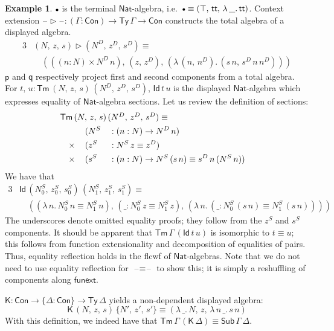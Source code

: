 \documentclass[12pt,a4paper,twoside,openany]{book}
\theoremstyle{remark}
\theoremstyle{definition}
\newtheorem{myexample}{Example}
\theoremstyle{theorem}
\newcommand{\ms}[1]{\mathsf{#1}}
\newcommand{\funext}{\ms{funext}}
\newcommand{\Con}{\mathsf{Con}}
\newcommand{\Sub}{\mathsf{Sub}}
\newcommand{\Tm}{\mathsf{Tm}}
\newcommand{\Ty}{\mathsf{Ty}}
\newcommand{\Id}{\mathsf{Id}}
\renewcommand{\tt}{\mathsf{tt}}
\newcommand{\blank}{\mathord{\hspace{1pt}\text{--}\hspace{1pt}}}
\newcommand{\ext}{\triangleright}
\newcommand{\emptycon}{\scaleobj{.75}\bullet}
\newcommand{\p}{\mathsf{p}}
\newcommand{\q}{\mathsf{q}}
\newcommand{\K}{\mathsf{K}}
\newcommand{\Nat}{\ms{Nat}}
\begin{document}
\begin{myexample}
$\emptycon$ is the terminal $\Nat$-algebra, i.e.\ $\emptycon \equiv
(\top,\,\tt,\,\lambda\,\_.\,\tt)$. Context extension $\blank\ext\blank : (\Gamma
: \Con) \to \Ty\,\Gamma \to \Con$ constructs the total algebra of a displayed
algebra.
\begin{alignat*}{3}
&(N,\,z,\,s) \ext (N^D,\,z^D,\,s^D) \equiv\\
&\hspace{1em}(((n : N) \times N^D\,n),\,(z,\,z^D),\,(\lambda\,(n,\,n^D).\,(s\,n,\,s^D\,n\,n^D)))
\end{alignat*}
$\p$ and $\q$ respectively project first and second components from a total
algebra. For $t,\,u : \Tm\,(N,\,z,\,s)\,(N^D,\,z^D,\,s^D)$, $\Id\,t\,u$ is the
displayed $\Nat$-algebra which expresses equality of $\Nat$-algebra sections.
Let us review the definition of sections:
\begin{alignat*}{3}
&\rlap{$\Tm\,(N,\,z,\,s)\,(N^D,\,z^D,\,s^D) \equiv$}\\
  &\hspace{1em}        \,&&(N^S &&: (n : N) \to N^D\,n)\\
  &\hspace{1em} \times \,&&(z^S &&: N^S\,z \equiv z^D)\\
  &\hspace{1em} \times \,&&(s^S &&: (n : N) \to N^S\,(s\,n) \equiv s^D\,n\,(N^S\,n))
\end{alignat*}
We have that
\begin{alignat*}{3}
  & \Id\,(N^S_0,\,z^S_0,\,s^S_0)\,(N^S_1,\,z^S_1,\,s^S_1) \equiv\\
  & \hspace{1em}((\lambda\,n.\,N^S_0\,n \equiv N^S_1\,n),\,(\_ : N^S_0\,z \equiv N^S_1\,z),\,
  (\lambda\,n.\,(\_ : N^S_0\,(s\,n) \equiv N^S_1\,(s\,n))))
\end{alignat*}
The underscores denote omitted equality proofs; they follow from the $z^S$ and
$s^S$ components. It should be apparent that $\Tm\,\Gamma\,(\Id\,t\,u)$ is isomorphic to $t
\equiv u$; this follows from function extensionality and decomposition of
equalities of pairs. Thus, equality reflection holds in the flcwf of
$\Nat$-algebras. Note that we do not need to use equality reflection for
$\blank\equiv\blank$ to show this; it is simply a reshuffling of components along $\funext$.

$\K : \Con \to \{\Delta : \Con\} \to \Ty\,\Delta$ yields a non-dependent displayed algebra:
\[
\K\,(N,\,z,\,s)\,\{N',\,z',\,s'\} \equiv (\lambda\,\_.\,N,\,z,\,\lambda\,n\,\_.\,s\,n)
\]
With this definition, we indeed have that $\Tm\,\Gamma\,(\K\,\Delta) \equiv
\Sub\,\Gamma\,\Delta$.


\end{myexample}
\end{document}

